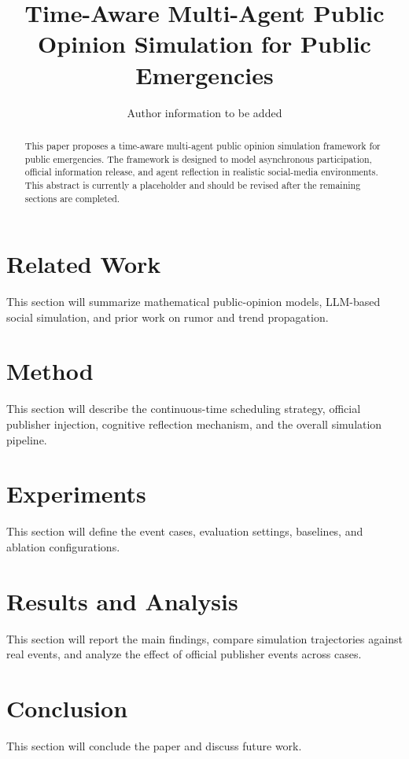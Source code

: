 \documentclass[runningheads]{llncs}
\begin{document}
\title{Time-Aware Multi-Agent Public Opinion Simulation for Public Emergencies}

\author{Author information to be added}


\maketitle

\begin{abstract}
This paper proposes a time-aware multi-agent public opinion simulation framework for public emergencies. The framework is designed to model asynchronous participation, official information release, and agent reflection in realistic social-media environments. This abstract is currently a placeholder and should be revised after the remaining sections are completed.
\end{abstract}



\section{Related Work}
This section will summarize mathematical public-opinion models, LLM-based social simulation, and prior work on rumor and trend propagation.

\section{Method}
This section will describe the continuous-time scheduling strategy, official publisher injection, cognitive reflection mechanism, and the overall simulation pipeline.

\section{Experiments}
This section will define the event cases, evaluation settings, baselines, and ablation configurations.

\section{Results and Analysis}
This section will report the main findings, compare simulation trajectories against real events, and analyze the effect of official publisher events across cases.

\section{Conclusion}
This section will conclude the paper and discuss future work.



\end{document}
